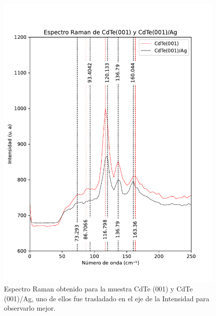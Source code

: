 \begin{figure}[H]
    \centering
    \includegraphics[width=1\textwidth]{figures/chap4/cdte-ag/raman-results/raman-CdTeAg-250.pdf}
        \caption{Espectro Raman obtenido para la muestra CdTe (001) y CdTe (001)/Ag, uno de ellos 
        fue trasladado en el eje de la Intensidad para observarlo mejor.}
    \label{fig:raman-cdte-250}
\end{figure}

